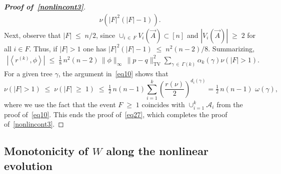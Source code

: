 \documentclass[10pt,a4paper]{article}
\renewcommand{\leq}{\;\leqslant\;}
\renewcommand{\geq}{\;\geqslant\;}
\newcommand{\tv}{\mathrm{TV}}
\newcommand{\cA}{\mathcal{A}}
\let\g=\gamma
\let\o=\omega
\begin{document}
\begin{proof}[{\bf Proof of~\eqref{nonlincont3}}]
\begin{align}
\nu\left(|F|^2(|F|-1)\right).
\end{align}
Next, observe that $|F|\leq n/2$, since $\cup_{i\,\in\,F}V_i(\vec A)\subset [n]$ and $|V_i(\vec A)|\geq 2$ for all $i\in F$. Thus, if $|F|>1$ one has $|F|^2(|F|-1)\leq n^2(n-2)/8$. Summarizing,
\begin{align}\label{eq2a87}
\left|\left\langle r^{(k)},\phi\right\rangle\right|\leq \tfrac{1}8\,n^2(n-2)\,\|\phi\|_\infty\,\|p-q\|_{\tv}^2 \sum_{\gamma\,\in\,\Gamma(k)}\alpha_k(\gamma)\nu(|F|>1).
\end{align}
For a given tree $\g$, the argument in~\eqref{eq10} shows that
\[
\nu(|F|>1)
\leq
\nu(|F|\geq 1) \leq
\tfrac12\,n(n-1)\sum_{i=1}^k\left(\frac{r(\nu)}{2}\right)^{d_i(\g)} = \tfrac12\,n(n-1)\,\,\o(\g),
\]
where we use the fact that the event $F\geq 1$ coincides with $\cup_{i=1}^k\cA_i$ from the proof of~\eqref{eq10}. This ends the proof of~\eqref{eq27}, which completes the proof of~\eqref{nonlincont3}.
\end{proof}

\subsection{Monotonicity of \texorpdfstring{$W$}{W} along the nonlinear evolution}
\end{document}
